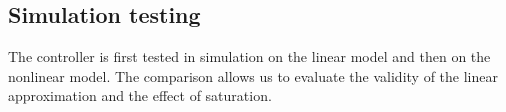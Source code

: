 \subsection{Simulation testing}

The controller is first tested in simulation on the linear model and then on the nonlinear model. The comparison allows us to evaluate the validity of the linear approximation and the effect of saturation.

